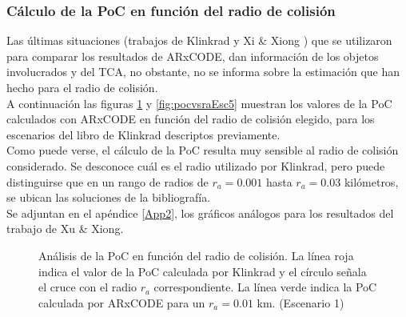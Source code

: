 \subsubsection*{C\'alculo de la PoC en funci\'on del radio de colisi\'on}

Las \'ultimas situaciones (trabajos de Klinkrad \citep{Klinkrad} y Xi \& Xiong \citep{xu2014method}) que se utilizaron para comparar los resultados de ARxCODE, dan informaci\'on de los objetos involucrados y del TCA, no obstante, no se informa sobre la estimaci\'on que han hecho para el radio de colisi\'on.\\

A continuaci\'on las figuras \ref{fig:pocvsraEsc4} y \ref{fig:pocvsraEsc5} muestran los valores de la PoC calculados con ARxCODE en funci\'on del radio de colisi\'on elegido, para los escenarios del libro de Klinkrad descriptos previamente.\\
Como puede verse, el c\'alculo de la PoC resulta muy sensible al radio de colisi\'on considerado. Se desconoce cu\'al es el radio utilizado por Klinkrad, pero puede distinguirse que en un rango de radios de $r_{a}=0.001$ hasta $r_{a}=0.03$ kil\'ometros, se ubican las soluciones de la bibliograf\'ia.\\

Se adjuntan en el ap\'endice \ref{App2}, los gr\'aficos an\'alogos para los resultados del trabajo de Xu \& Xiong.\\

 
\begin{figure}[!h]
  \centering
  \caption{An\'alisis de la PoC en funci\'on del radio de colisi\'on. La l\'inea roja indica el valor de la PoC calculada por Klinkrad \citep{Klinkrad} y el c\'irculo se\~nala el cruce con el radio $r_{a}$ correspondiente. La l\'inea verde indica la PoC calculada por ARxCODE para un $r_{a}=0.01$ km. (Escenario 1)}
  \label{fig:pocvsraEsc4}
\end{figure}

